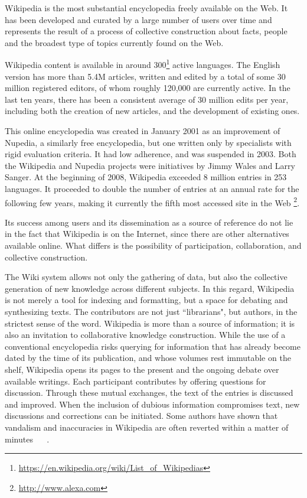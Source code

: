 Wikipedia is the most substantial encyclopedia freely available on the Web. It has been developed and curated by a large number of users over time and represents the result of a process of collective construction about facts, people and the broadest type of topics currently found on the Web.

Wikipedia content is available in around 300\footnote{\url{https://en.wikipedia.org/wiki/List_of_Wikipedias}} active languages. The English version has more than 5.4M articles,  written and edited by a total of some 30 million registered editors, of whom roughly 120,000 are currently active. In the last ten years, there has been a consistent average of 30 million edits per year, including both the creation of new articles, and the development of existing ones. 

This online encyclopedia was created in January 2001 as an improvement of Nupedia, a similarly free encyclopedia, but one written only by specialists with rigid evaluation criteria. It had low adherence, and was suspended in 2003.
Both the Wikipedia and Nupedia projects were initiatives by Jimmy Wales and Larry Sanger. At the beginning of 2008, Wikipedia exceeded 8 million entries in 253 languages. It proceeded to double the number of entries at an annual rate for the following few years, making it currently the fifth most accessed site in the Web%
\footnote{\url{http://www.alexa.com}}.

Its success among users and its dissemination as a source of reference do not lie in the fact that Wikipedia is on the Internet, since there are other alternatives available online. What differs is the possibility of participation, collaboration, and collective construction. 


The Wiki system allows not only the gathering of data, but also the collective generation of new knowledge across different subjects. In this regard, Wikipedia is not merely a tool for indexing and formatting, but a space for debating and synthesizing texts. The contributors are not just ``librarians", but authors, in the strictest sense of the word. Wikipedia is more than a source of information; it is also an invitation to collaborative knowledge construction. While the use of a conventional encyclopedia risks querying for information that has already become dated by the time of its publication, and whose volumes rest immutable on the shelf, Wikipedia opens its pages to the present and the ongoing debate over available writings. Each participant contributes by offering questions for discussion. Through these mutual exchanges, the text of the entries is discussed and improved. When the inclusion of dubious information compromises text, new discussions and corrections can be initiated.
Some authors have shown that vandalism and inaccuracies in Wikipedia are often reverted within a matter of minutes ~\cite{kittur2007he} ~\cite{viegas2004studying}.

